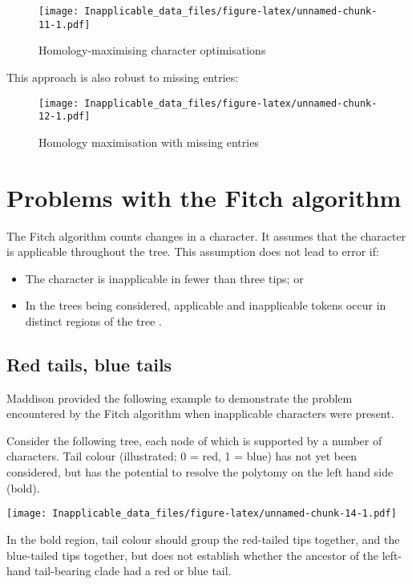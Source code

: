 \documentclass[]{book}
\theoremstyle{definition}
\theoremstyle{definition}
\theoremstyle{definition}
\theoremstyle{remark}
\begin{document}
\begin{figure}
\centering
\texttt{[image: Inapplicable\_data\_files/figure-latex/unnamed-chunk-11-1.pdf]}
\caption{\label{fig:unnamed-chunk-11}Homology-maximising character
optimisations}
\end{figure}

This approach is also robust to missing entries:

\begin{figure}
\centering
\texttt{[image: Inapplicable\_data\_files/figure-latex/unnamed-chunk-12-1.pdf]}
\caption{\label{fig:unnamed-chunk-12}Homology maximisation with missing
entries}
\end{figure}

\hypertarget{problems}{\chapter{Problems with the Fitch
algorithm}\label{problems}}

The Fitch algorithm \citep{Fitch1971} counts changes in a character. It
assumes that the character is applicable throughout the tree. This
assumption does not lead to error if:

\begin{itemize}
\item
  The character is inapplicable in fewer than three tips; or
\item
  In the trees being considered, applicable and inapplicable tokens
  occur in distinct regions of the tree \citep{Maddison1993}.
\end{itemize}

\section{Red tails, blue tails}\label{red-tails-blue-tails}

Maddison \citeyearpar{Maddison1993} provided the following example to
demonstrate the problem encountered by the Fitch algorithm when
inapplicable characters were present.

Consider the following tree, each node of which is supported by a number
of characters. Tail colour (illustrated; 0 = red, 1 = blue) has not yet
been considered, but has the potential to resolve the polytomy on the
left hand side (bold).

\texttt{[image: Inapplicable\_data\_files/figure-latex/unnamed-chunk-14-1.pdf]}

In the bold region, tail colour should group the red-tailed tips
together, and the blue-tailed tips together, but does not establish
whether the ancestor of the left-hand tail-bearing clade had a red or
blue tail.
\end{document}
